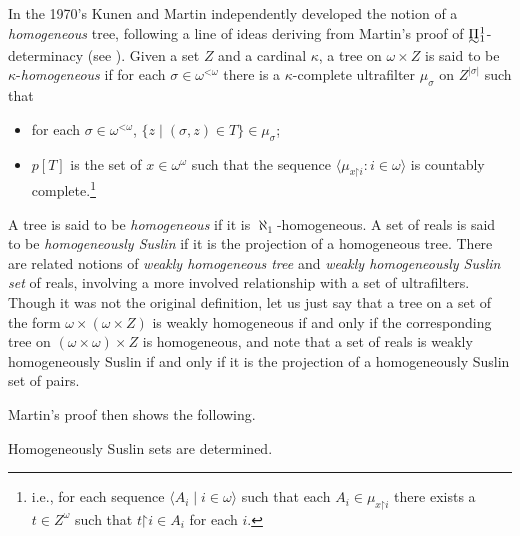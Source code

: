 \documentclass{book}%
\def\underTilde#1{{\baselineskip=0pt\vtop{\hbox{$#1$}\hbox{$\sim$}}}{}}
\newcommand{\uTPi}{\underTilde{\Pi}}
\newcommand{\restrict}{\mathord{\upharpoonright}}
\newcommand{\less}{\mathord{<}}
\begin{document}
In the 1970's Kunen and Martin independently developed the notion of a \emph{homogeneous} tree, following
a line of ideas deriving from Martin's proof of $\uTPi^{1}_{1}$-determinacy (see \cite{Kechris:1981}).
Given a set $Z$ and a cardinal $\kappa$, a tree on $\omega \times Z$ is said to be $\kappa$-\emph{homogeneous} if for each
$\sigma \in \omega^{\less\omega}$ there is a $\kappa$-complete
ultrafilter $\mu_{\sigma}$ on $Z^{|\sigma|}$ such that
\begin{itemize}
\item for each $\sigma \in \omega^{\less\omega}$, $\{ z \mid (\sigma, z)
\in T \} \in \mu_{\sigma}$;
\item $p[T]$ is the set of $x \in \omega^{\omega}$ such that the
sequence $\langle \mu_{x \restrict i} : i \in \omega \rangle$ is
countably complete.\footnote{i.e., for each sequence $\langle A_{i}
\mid i \in \omega \rangle$ such that each $A_{i} \in \mu_{x
\restrict i}$ there exists a $t \in Z^{\omega}$ such that $t
\restrict i \in A_{i}$ for each $i$.}
\end{itemize}
A tree is said to be
\emph{homogeneous}
if it is $\aleph_{1}$-homogeneous. A set of reals is said to be
\emph{homogeneously Suslin}
if it is the
projection of a homogeneous tree. There are related notions of
\emph{weakly homogeneous tree} and \emph{weakly homogeneously
Suslin set} of reals, involving a more involved relationship with a
set of ultrafilters. Though it was not the original definition, let us just say that a tree on a set of
the form $\omega \times (\omega \times Z)$ is weakly homogeneous
if and only if the corresponding tree on $(\omega \times
\omega) \times Z$ is homogeneous, and note that a set of
reals is weakly homogeneously Suslin if and only if it is the
projection of a homogeneously Suslin set of
pairs.

Martin's proof then shows the following.

\begin{theorem} Homogeneously Suslin sets are determined.
\end{theorem}
\end{document}

